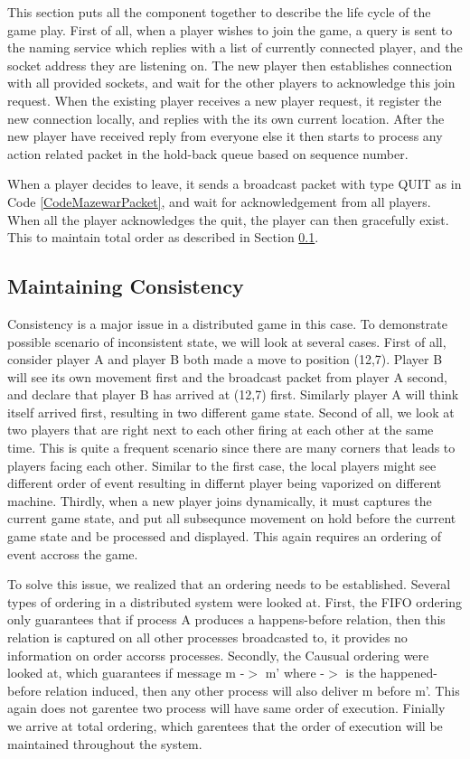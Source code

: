 This section puts all the component together to describe the life cycle of the game play. First of all, when a player wishes to join the game, a query is sent to the naming service which replies with a list of currently connected player, and the socket address they are listening on. The new player then establishes connection with all provided sockets, and wait for the other players to acknowledge this join request. When the existing player receives a new player request, it register the new connection locally, and replies with the its own current location. After the new player have received reply from everyone else it then starts to process any action related packet in the hold-back queue based on sequence number.

When a player decides to leave, it sends a broadcast packet with type QUIT as in Code \ref{CodeMazewarPacket}, and wait for acknowledgement from all players. When all the player acknowledges the quit, the player can then gracefully exist. This to maintain total order as described in Section \ref{DesignConsistency}.

\subsection{Maintaining Consistency}\label{DesignConsistency}

Consistency is a major issue in a distributed game in this case. To demonstrate possible scenario of inconsistent state, we will look at several cases. First of all, consider player A and player B both made a move to position (12,7). Player B will see its own movement first and the broadcast packet from player A second, and declare that player B has arrived at (12,7) first. Similarly player A will think itself arrived first, resulting in two different game state. Second of all, we look at two players that are right next to each other firing at each other at the same time. This is quite a frequent scenario since there are many corners that leads to players facing each other. Similar to the first case, the local players might see different order of event resulting in differnt player being vaporized on different machine. Thirdly, when a new player joins dynamically, it must captures the current game state, and put all subsequnce movement on hold before the current game state and be processed and displayed. This again requires an ordering of event accross the game.

To solve this issue, we realized that an ordering needs to be established. Several types of ordering in a distributed system were looked at. First, the FIFO ordering only guarantees that if process A produces a happens-before relation, then this relation is captured on all other processes broadcasted to, it provides no information on order accorss processes. Secondly, the Causual ordering were looked at, which guarantees if message m -$>$ m' where -$>$ is the happened-before relation induced, then any other process will also deliver m before m'. This again does not garentee two process will have same order of execution. Finially we arrive at total ordering, which garentees that the order of execution will be maintained throughout the system.

